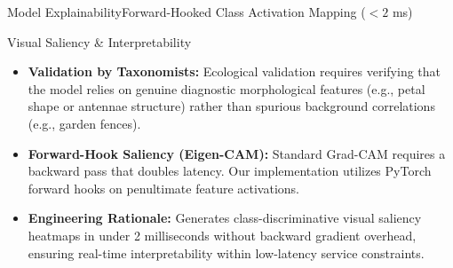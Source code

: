 \begin{frame}{Model Explainability}{Forward-Hooked Class Activation Mapping ($<2$ ms)}
    \begin{block}{Visual Saliency \& Interpretability}
        \begin{itemize}\small
            \item \textbf{Validation by Taxonomists:} Ecological validation requires verifying that the model relies on genuine diagnostic morphological features (e.g., petal shape or antennae structure) rather than spurious background correlations (e.g., garden fences).
            \item \textbf{Forward-Hook Saliency (Eigen-CAM):} Standard Grad-CAM requires a backward pass that doubles latency. Our implementation utilizes PyTorch forward hooks on penultimate feature activations.
            \item \textbf{Engineering Rationale:} Generates class-discriminative visual saliency heatmaps in under 2 milliseconds without backward gradient overhead, ensuring real-time interpretability within low-latency service constraints.
        \end{itemize}
    \end{block}


\end{frame}
